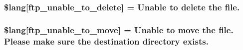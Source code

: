 \subsubsection[{\$lang}]{\setlength{\rightskip}{0pt plus 5cm}\$lang\mbox{[}\textquotesingle{}ftp\+\_\+unable\+\_\+to\+\_\+delete\textquotesingle{}\mbox{]} = \textquotesingle{}Unable to delete the file.\textquotesingle{}}\label{ftp__lang_8php_a922b1d7a3667e2cacb0873788e548dca}
\hypertarget{ftp__lang_8php_a72178091982e6697b12337601213fa76}{}
\subsubsection[{\$lang}]{\setlength{\rightskip}{0pt plus 5cm}\$lang\mbox{[}\textquotesingle{}ftp\+\_\+unable\+\_\+to\+\_\+move\textquotesingle{}\mbox{]} = \textquotesingle{}Unable to move the file. Please make sure the destination directory exists.\textquotesingle{}}\label{ftp__lang_8php_a72178091982e6697b12337601213fa76}
